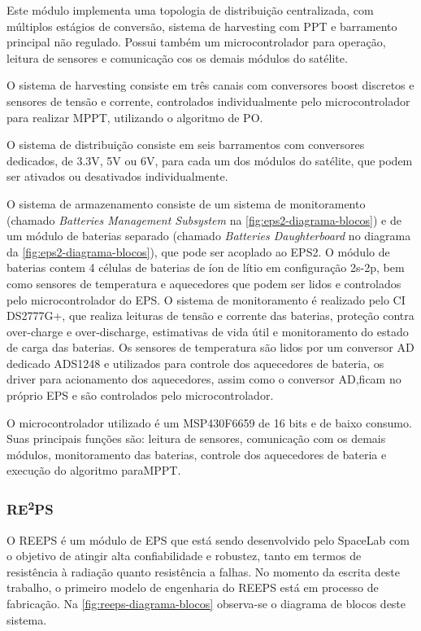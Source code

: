 Este módulo implementa uma topologia de distribuição centralizada, com múltiplos estágios de conversão, sistema de harvesting com \gls{PPT} e barramento principal não regulado.
Possui também um microcontrolador para operação, leitura de sensores e comunicação cos os demais módulos do satélite.

O sistema de harvesting consiste em três canais com conversores boost discretos e sensores de tensão e corrente, controlados individualmente pelo microcontrolador para realizar \gls{MPPT}, utilizando o algoritmo de \gls{PO}.

O sistema de distribuição consiste em seis barramentos com conversores dedicados, de 3.3V, 5V ou 6V, para cada um dos módulos do satélite, que podem ser ativados ou desativados individualmente.

O sistema de armazenamento consiste de um sistema de monitoramento (chamado \textit{Batteries Management Subsystem} na \autoref{fig:eps2-diagrama-blocos}) e de um módulo de baterias separado (chamado \textit{Batteries Daughterboard} no diagrama da \autoref{fig:eps2-diagrama-blocos}), que pode ser acoplado ao \gls{EPS2}.
O módulo de baterias contem 4 células de baterias de íon de lítio em configuração 2s-2p, bem como sensores de temperatura e aquecedores que podem ser lidos e controlados pelo microcontrolador do \gls{EPS}.
O sistema de monitoramento é realizado pelo CI DS2777G+, que realiza leituras de tensão e corrente das baterias, proteção contra over-charge e over-discharge, estimativas de vida útil e monitoramento do estado de carga das baterias.
Os sensores de temperatura são lidos por um conversor AD dedicado ADS1248 e utilizados para controle dos aquecedores de bateria, os driver para acionamento dos aquecedores, assim como o conversor AD,ficam no próprio \gls{EPS} e são controlados pelo microcontrolador.

O microcontrolador utilizado é um MSP430F6659 de 16 bits e de baixo consumo.
Suas principais funções são: leitura de sensores, comunicação com os demais módulos, monitoramento das baterias, controle dos aquecedores de bateria e execução do algoritmo para\gls{MPPT}.


\subsubsection{\texorpdfstring{RE\textsuperscript{2}PS}{REEPS}}


O \gls{REEPS} é um módulo de \gls{EPS} que está sendo desenvolvido pelo SpaceLab com o objetivo de atingir alta confiabilidade e robustez, tanto em termos de resistência à radiação quanto resistência a falhas.
No momento da escrita deste trabalho, o primeiro modelo de engenharia do \gls{REEPS} está em processo de fabricação.
Na \autoref{fig:reeps-diagrama-blocos} observa-se o diagrama de blocos deste sistema.

